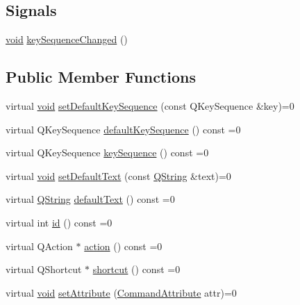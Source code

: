 \subsection*{\-Signals}
\begin{DoxyCompactItemize}
\item 
\hyperlink{group___u_a_v_objects_plugin_ga444cf2ff3f0ecbe028adce838d373f5c}{void} \hyperlink{group___core_plugin_ga4e8398381143aeb4216199854fdaf0ab}{key\-Sequence\-Changed} ()
\end{DoxyCompactItemize}
\subsection*{\-Public \-Member \-Functions}
\begin{DoxyCompactItemize}
\item 
virtual \hyperlink{group___u_a_v_objects_plugin_ga444cf2ff3f0ecbe028adce838d373f5c}{void} \hyperlink{group___core_plugin_ga9edb60253a233526349538b2fcb2e093}{set\-Default\-Key\-Sequence} (const \-Q\-Key\-Sequence \&key)=0
\item 
virtual \-Q\-Key\-Sequence \hyperlink{group___core_plugin_ga0c83dee8e3b5d218dd4273e801bfe106}{default\-Key\-Sequence} () const =0
\item 
virtual \-Q\-Key\-Sequence \hyperlink{group___core_plugin_ga489c0ef6a565b2af079f1fc61c2bf1d2}{key\-Sequence} () const =0
\item 
virtual \hyperlink{group___u_a_v_objects_plugin_ga444cf2ff3f0ecbe028adce838d373f5c}{void} \hyperlink{group___core_plugin_ga01b34fc1e361fb10f26bce17e7f1abd7}{set\-Default\-Text} (const \hyperlink{group___u_a_v_objects_plugin_gab9d252f49c333c94a72f97ce3105a32d}{\-Q\-String} \&text)=0
\item 
virtual \hyperlink{group___u_a_v_objects_plugin_gab9d252f49c333c94a72f97ce3105a32d}{\-Q\-String} \hyperlink{group___core_plugin_gafb9261fe7f3e6b06f367257eae11d0ed}{default\-Text} () const =0
\item 
virtual int \hyperlink{group___core_plugin_ga86ee1c7ad9c36b2b3b4d6d5c4a8c7782}{id} () const =0
\item 
virtual \-Q\-Action $\ast$ \hyperlink{group___core_plugin_ga68bf6b0115ef45e9a734956f3b0d40c5}{action} () const =0
\item 
virtual \-Q\-Shortcut $\ast$ \hyperlink{group___core_plugin_ga3cbc83d8c6c353b4b28c436a691ae970}{shortcut} () const =0
\item 
virtual \hyperlink{group___u_a_v_objects_plugin_ga444cf2ff3f0ecbe028adce838d373f5c}{void} \hyperlink{group___core_plugin_ga07112a6a39d461f7bba7e470077ef3f4}{set\-Attribute} (\hyperlink{group___core_plugin_ga4d899c1f711159a432afeab3eb78c917}{\-Command\-Attribute} attr)=0

\end{DoxyCompactItemize}
